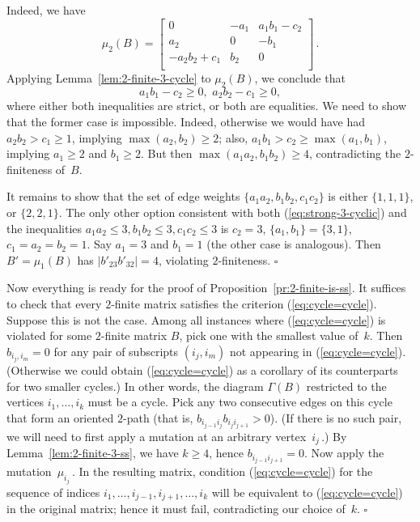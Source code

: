 \documentclass[letterpaper]{amsart}
\numberwithin{equation}{section}
\theoremstyle{definition}
\def\endproof{\hfill$\square$\medskip}
\begin{document}
Indeed, we have 
\begin{equation} 
\label{eq:3by3matrix-mutated} 
\mu_2(B)= 
\left[\begin{array}{ccc} 
0   & -a_1 & a_1 b_1 -c_2 \\ 
a_2 & 0   & -b_1 \\ 
-a_2 b_2+ c_1 & b_2 & 0 \\ 
\end{array}\right] \,. 
\end{equation} 
Applying Lemma~\ref{lem:2-finite-3-cycle} to 
$\mu_2(B)$, we conclude that 
$$a_1 b_1 -c_2 \geq 0, \,\, a_2 b_2 -c_1 \geq 0 ,$$ 
where either both inequalities are strict, or both are equalities. 
We need to show that the former case is impossible. 
Indeed, otherwise we would have had 
$a_2 b_2 > c_1 \geq 1$, implying 
$\max (a_2, b_2) \geq 2$; 
also, $a_1 b_1 > c_2 \geq \max (a_1, b_1)$, implying 
$a_1 \geq 2$ and $b_1 \geq 2$. 
But then 
$\max(a_1 a_2, b_1 b_2) %
\geq 4$, 
contradicting the $2$-finiteness of~$B$. 
 
It remains to show that the set of edge weights 
$\{a_1a_2,b_1b_2,c_1c_2\}$ 
is either $\{1,1,1\}$, or $\{2,2,1\}$. 
The only other option consistent with both (\ref{eq:strong-3-cyclic}) and 
the inequalities $a_1a_2\leq 3,b_1b_2\leq 3,c_1c_2\leq 3$ is 
$c_2=3$, $\{a_1,b_1\}=\{3,1\}$, $c_1=a_2=b_2=1$. 
Say $a_1=3$ and $b_1=1$ (the other case is analogous). 
Then $B'=\mu_1(B)$ has $|b'_{23}b'_{32}|=4$, 
violating $2$-finiteness. 
\endproof 
 
 
Now everything is ready for the proof of 
Proposition~\ref{pr:2-finite-is-ss}. 
It suffices to check that every $2$-finite matrix satisfies the criterion (\ref{eq:cycle=cycle}). 
Suppose this is not the case. 
Among all instances where (\ref{eq:cycle=cycle}) is violated for some 
$2$-finite matrix $B$, pick one with the smallest value of~$k$. 
Then $b_{i_j, i_m}=0$ for any pair of subscripts $(i_j,i_m)$ not 
appearing in (\ref{eq:cycle=cycle}). 
(Otherwise we could obtain (\ref{eq:cycle=cycle}) as a 
corollary of its counterparts for two smaller cycles.) 
In other words, the diagram $\Gamma(B)$ restricted to the vertices 
$i_1,\dots,i_k$ must be a cycle. 
Pick any two consecutive edges on this cycle that form an oriented 
$2$-path (that is, $b_{i_{j-1} i_j} b_{i_j i_{j+1}}>0$). 
(If there is no such pair, we will need to first apply a mutation at an 
arbitrary vertex~$i_j\,$.) 
By Lemma~\ref{lem:2-finite-3-ss}, we have $k \geq 4$, hence 
$b_{i_{j-1} i_{j+1}} = 0$. 
Now apply the mutation~$\mu_{i_j}\,$. 
In the resulting matrix, condition (\ref{eq:cycle=cycle}) for the 
sequence of indices $i_1,\dots,i_{j-1},i_{j+1},\dots,i_k$ will be 
equivalent to (\ref{eq:cycle=cycle}) in the original matrix; 
hence it must fail, contradicting our choice of~$k$. 
\endproof 
 
\end{document}
